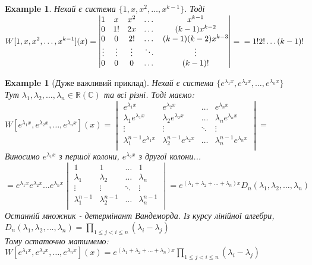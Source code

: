\documentclass[a4paper, 10pt]{article}
\theoremstyle{theoremdd}
\theoremstyle{theoremdd}
\theoremstyle{theoremdd}
\theoremstyle{theoremdd}
\newtheorem{example}[theorem]{Example}
\theoremstyle{theoremdd}
\theoremstyle{theoremdd}
\theoremstyle{theoremdd}
\theoremstyle{theoremdd}
\begin{document}
	\begin{example}
 Нехай є система $\{1,x,x^2,\dots,x^{k-1}\}$. Тоді\\
	$\displaystyle W[1,x,x^2,\dots,x^{k-1}](x) = 
	\begin{vmatrix} 
	1 &  x & x^2 & \dots & x^{k-1} \\ 
	0 &  1! & 2x & \dots & (k-1)x^{k-2} \\ 
	0 &  0 & 2! & \dots & (k-1)(k-2)x^{k-3} \\
	\vdots & \vdots & \vdots & \ddots & \vdots \\
	0 &  0 & 0 & \dots & (k-1)! \\
\end{vmatrix} = \\ = 1! 2! \dots (k-1)!$
	\end{example}
	
	\begin{example}[Дуже важливий приклад]
	Нехай є система $\displaystyle \{e^{\lambda_1 x}, e^{\lambda_2 x}, \dots, e^{\lambda_n x}\}$\\
	Тут $\lambda_1, \lambda_2, \dots, \lambda_n \in \mathbb{R} (\mathbb{C})$ та всі різні. Тоді маємо:\\
	$\displaystyle W[e^{\lambda_1 x}, e^{\lambda_2 x}, \dots, e^{\lambda_n x}](x) = 
\begin{vmatrix} 
	e^{\lambda_1 x} &  e^{\lambda_2 x} & \dots & e^{\lambda_n x} \\ 
	\lambda_1 e^{\lambda_1 x} &  \lambda_2 e^{\lambda_2 x} & \dots & \lambda_n e^{\lambda_n x} \\ 
	\vdots &  \vdots & \ddots & \vdots \\
	\lambda_1^{n-1} e^{\lambda_1 x} &  \lambda_2^{n-1} e^{\lambda_2 x} & \dots & \lambda_n^{n-1} e^{\lambda_n x} \\
\end{vmatrix} \boxed{=}$\\
Виносимо $e^{\lambda_1 x}$ з першої колони, $e^{\lambda_2 x}$ з другої колони...\\
$\displaystyle \boxed{=}
e^{\lambda_1 x} e^{\lambda_2 x} \dots e^{\lambda_n x}
\begin{vmatrix} 
	1 &  1 & \dots &  1 \\ 
	\lambda_1 &  \lambda_2 & \dots & \lambda_n \\ 
	\vdots &  \vdots & \ddots & \vdots \\
	\lambda_1^{n-1} &  \lambda_2^{n-1} & \dots & \lambda_n^{n-1} \\
\end{vmatrix} = e^{(\lambda_1+\lambda_2+\dots+\lambda_n)x} D_n(\lambda_1, \lambda_2, \dots, \lambda_n)
$\\
Останній множник - детермінант Вандеморда. Із курсу лінійної алгебри,\\
$\displaystyle D_n(\lambda_1, \lambda_2, \dots, \lambda_n) = \prod_{1 \leq j < i \leq n} (\lambda_i-\lambda_j)$\\
Тому остаточно матимемо:\\
$\displaystyle W[e^{\lambda_1 x}, e^{\lambda_2 x}, \dots, e^{\lambda_n x}](x) = e^{(\lambda_1+\lambda_2+\dots+\lambda_n)x} \prod_{1 \leq j < i \leq n} (\lambda_i-\lambda_j)$
\end{example}
\end{document}
